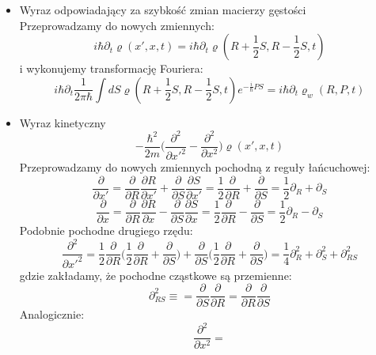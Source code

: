 \begin{itemize}
\item Wyraz odpowiadający za szybkość zmian macierzy gęstości\\
Przeprowadzamy do nowych zmiennych:
\begin{equation}i\hbar\partial_t\varrho(x',x,t)=
i\hbar\partial_t\varrho(R+\frac{1}{2}S,R-\frac{1}{2}S,t)
\end{equation}
i wykonujemy transformację Fouriera:
\begin{equation}
i\hbar\partial_t\frac{1}{2\pi\hbar}\int dS\varrho(R+\frac{1}{2}S,R-\frac{1}{2}S,t) 
e^{-\frac{i}{\hbar}PS}=i\hbar\partial_t\varrho_w(R,P,t)
\end{equation}
\item Wyraz kinetyczny
\begin{equation}
-\frac{\hbar^2}{2m}\Big(\frac{\partial^2}{\partial x'^2}-\frac{\partial^2}{\partial x^2}\Big)\varrho(x',x,t)
\end{equation}
Przeprowadzamy do nowych zmiennych pochodną z reguły łańcuchowej:
\begin{equation}\frac{\partial}{\partial x'}=
\frac{\partial}{\partial R}\frac{\partial R}{\partial x'}+
\frac{\partial}{\partial S}\frac{\partial S}{\partial x'}=
\frac{1}{2}\frac{\partial}{\partial R}+
\frac{\partial}{\partial S}=
\frac{1}{2}\partial_R+
\partial_S
\end{equation}
\begin{equation}\frac{\partial}{\partial x}=
\frac{\partial}{\partial R}\frac{\partial R}{\partial x}-
\frac{\partial}{\partial S}\frac{\partial S}{\partial x}=
\frac{1}{2}\frac{\partial}{\partial R}-
\frac{\partial}{\partial S}=
\frac{1}{2}\partial_R-
\partial_S
\end{equation}
Podobnie pochodne drugiego rzędu:
\begin{equation}\frac{\partial^2}{\partial x'^2}=
\frac{1}{2}\frac{\partial}{\partial R}\Big(\frac{1}{2}\frac{\partial}{\partial R}+
\frac{\partial}{\partial S}\Big)+
\frac{\partial}{\partial S}\Big(\frac{1}{2}\frac{\partial}{\partial R}+
\frac{\partial}{\partial S}\Big)=\frac{1}{4}\partial_R^2+
\partial_S^2+{\partial_{RS}^2}
\end{equation}
gdzie zakładamy, że pochodne cząstkowe są przemienne:
\begin{equation}
\partial_{RS}^2\equiv=\frac{\partial}{\partial S}\frac{\partial}{\partial R}=\frac{\partial}{\partial R}\frac{\partial}{\partial S}
\end{equation}
Analogicznie:
\begin{equation}\frac{\partial^2}{\partial x^2}=

\end{equation}
\end{itemize}
